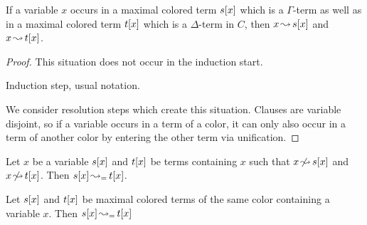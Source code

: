 \documentclass[,%
	paper=a4,%
	DIV10, %
	twoside=false,%
	liststotoc,
	bibtotoc,
	draft=false,%
	numbers=noendperiod
]{scrartcl}
\begin{document}
\begin{clemma}
	\label{lemma:arrow_from_one_color_to_other_color}
	If a variable $x$ occurs in a maximal colored term $s[x]$ which is a $\Gamma$-term as well as in a maximal colored term $t[x]$ which is a $\Delta$-term in $C$, then $x\operatorname{\leadsto} s[x]$ and $x\operatorname{\leadsto} t[x]$.
\end{clemma}
\begin{proof}
	This situation does not occur in the induction start.

	Induction step, usual notation.

	We consider resolution steps which create this situation. 
	Clauses are variable disjoint, so if a variable occurs in a term of a color, it can only also occur in a term of another color by entering the other term via unification.

\end{proof}


\begin{clemma}
	\label{wrong:same_color2}
	Let $x$ be a variable $s[x]$ and $t[x]$ be terms containing $x$ such that $x\operatorname{\not\leadsto} s[x]$ and $x\operatorname{\not\leadsto} t[x]$.
	\label{lemma:merge_arrow_between_same_colored_terms}
	Then $s[x] \operatorname{\leadsto_=} t[x]$.
\end{clemma}

\begin{clemma}
	\label{wrong:same_color}
	Let $s[x]$ and $t[x]$ be maximal colored terms of the same color containing a variable $x$. 
	Then $s[x] \operatorname{\leadsto_=} t[x]$
\end{clemma}
\end{document}
